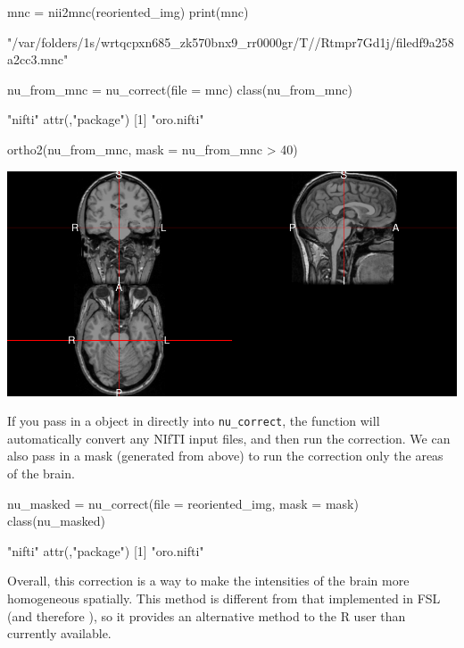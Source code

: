 \begin{Schunk}
\begin{Sinput}
mnc = nii2mnc(reoriented_img)
print(mnc)
\end{Sinput}
\begin{Soutput}
[1] "/var/folders/1s/wrtqcpxn685_zk570bnx9_rr0000gr/T//Rtmpr7Gd1j/filedf9a258a2cc3.mnc"
\end{Soutput}
\begin{Sinput}
nu_from_mnc = nu_correct(file = mnc)
class(nu_from_mnc)
\end{Sinput}
\begin{Soutput}
[1] "nifti"
attr(,"package")
[1] "oro.nifti"
\end{Soutput}
\begin{Sinput}
ortho2(nu_from_mnc, mask = nu_from_mnc > 40)
\end{Sinput}

\includegraphics{Freesurfer_files/figure-latex/nu_correct_mcn2nii-1} \end{Schunk}

If you pass in a  object in directly into
\texttt{nu\_correct}, the function will automatically convert any NIfTI
input files, and then run the correction. We can also pass in a mask
(generated from above) to run the correction only the areas of the
brain.

\begin{Schunk}
\begin{Sinput}
nu_masked = nu_correct(file = reoriented_img, mask = mask)
class(nu_masked)
\end{Sinput}
\begin{Soutput}
[1] "nifti"
attr(,"package")
[1] "oro.nifti"
\end{Soutput}
\end{Schunk}

Overall, this correction is a way to make the intensities of the brain
more homogeneous spatially. This method is different from that
implemented in FSL (and therefore ), so it provides an
alternative method to the R user than currently available.

